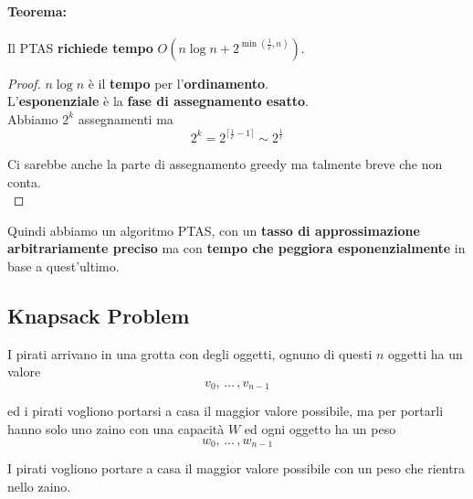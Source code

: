\documentclass[11pt]{article}
\begin{document}
	\paragraph{Teorema:} Il PTAS \textbf{richiede tempo} $O\left(n \log n + 2^{\min \left(\frac{1}{\epsilon}, n\right)}\right)$.\\
	
	\begin{proof}
		$n \log n$ è il \textbf{tempo} per l'\textbf{ordinamento}.\\
		
		L'\textbf{esponenziale} è la \textbf{fase di assegnamento esatto}.\\
		
		Abbiamo $2^k$ assegnamenti ma 
		$$ 2^k = 2^{\lceil \frac{1}{\epsilon} - 1\rceil} \sim 2^{\frac{1}{\epsilon}}$$
		
		Ci sarebbe anche la parte di assegnamento greedy ma talmente breve che non conta.\\
	\end{proof}
	
	Quindi abbiamo un algoritmo PTAS, con un \textbf{tasso di approssimazione arbitrariamente preciso} ma con \textbf{tempo che peggiora esponenzialmente} in base a quest'ultimo.\\
	
	\newpage
	
	\subsection{Knapsack Problem}
	
	I pirati arrivano in una grotta con degli oggetti, ognuno di questi $n$ oggetti ha un valore 
	$$ v_0, \, \dots \, , v_{n-1} $$
	
	ed i pirati vogliono portarsi a casa il maggior valore possibile, ma per portarli hanno solo uno zaino con una capacità $W$ ed ogni oggetto ha un peso  
	$$ w_0, \, \dots \, , w_{n-1} $$
	
	I pirati vogliono portare a casa il maggior valore possibile con un peso che rientra nello zaino.\\
	
	
	
	
	
\end{document}

